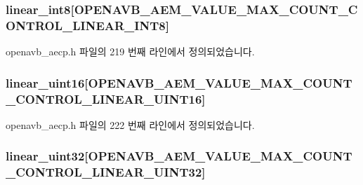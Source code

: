 \subsubsection[{\texorpdfstring{linear\+\_\+int8}{linear_int8}}]{ linear\+\_\+int8\mbox{[}{\bf O\+P\+E\+N\+A\+V\+B\+\_\+\+A\+E\+M\+\_\+\+V\+A\+L\+U\+E\+\_\+\+M\+A\+X\+\_\+\+C\+O\+U\+N\+T\+\_\+\+C\+O\+N\+T\+R\+O\+L\+\_\+\+L\+I\+N\+E\+A\+R\+\_\+\+I\+N\+T8}\mbox{]}}\hypertarget{structopenavb__aecp__commandresponse__data__set__control__t_a45419fbe4bd6ac07e20b168e97eef09c}{}\label{structopenavb__aecp__commandresponse__data__set__control__t_a45419fbe4bd6ac07e20b168e97eef09c}


openavb\+\_\+aecp.\+h 파일의 219 번째 라인에서 정의되었습니다.

\subsubsection[{\texorpdfstring{linear\+\_\+uint16}{linear_uint16}}]{ linear\+\_\+uint16\mbox{[}{\bf O\+P\+E\+N\+A\+V\+B\+\_\+\+A\+E\+M\+\_\+\+V\+A\+L\+U\+E\+\_\+\+M\+A\+X\+\_\+\+C\+O\+U\+N\+T\+\_\+\+C\+O\+N\+T\+R\+O\+L\+\_\+\+L\+I\+N\+E\+A\+R\+\_\+\+U\+I\+N\+T16}\mbox{]}}\hypertarget{structopenavb__aecp__commandresponse__data__set__control__t_afd0deb9ad36fea24f7188886e6899474}{}\label{structopenavb__aecp__commandresponse__data__set__control__t_afd0deb9ad36fea24f7188886e6899474}


openavb\+\_\+aecp.\+h 파일의 222 번째 라인에서 정의되었습니다.

\subsubsection[{\texorpdfstring{linear\+\_\+uint32}{linear_uint32}}]{ linear\+\_\+uint32\mbox{[}{\bf O\+P\+E\+N\+A\+V\+B\+\_\+\+A\+E\+M\+\_\+\+V\+A\+L\+U\+E\+\_\+\+M\+A\+X\+\_\+\+C\+O\+U\+N\+T\+\_\+\+C\+O\+N\+T\+R\+O\+L\+\_\+\+L\+I\+N\+E\+A\+R\+\_\+\+U\+I\+N\+T32}\mbox{]}}\hypertarget{structopenavb__aecp__commandresponse__data__set__control__t_a3505f0d5403a1f209788246b210d6422}{}\label{structopenavb__aecp__commandresponse__data__set__control__t_a3505f0d5403a1f209788246b210d6422}


